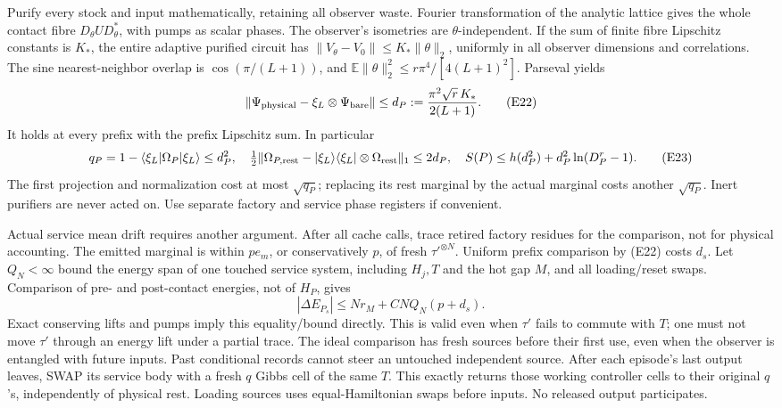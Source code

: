 \documentclass[11pt]{article}
\theoremstyle{definition}
\theoremstyle{remark}
\begin{document}
Purify every stock and input mathematically, retaining all observer
waste. Fourier transformation of the analytic lattice gives the
whole contact fibre \(D_\theta U D_\theta^*\), with pumps as scalar
phases. The observer's isometries are \(\theta\)-independent.
If the sum of finite fibre Lipschitz constants is \(K_*\), the entire
adaptive purified circuit has
\(\|V_\theta-V_0\|\le K_*\|\theta\|_2\), uniformly in all observer
dimensions and correlations. The sine nearest-neighbor overlap is
\(\cos(\pi/(L+1))\), and
\(\mathbb E\|\theta\|_2^2\le r\pi^4/[4(L+1)^2]\).
Parseval yields
\[
 \|\Psi_{\rm physical}-\xi_L\otimes\Psi_{\rm bare}\|
 \le d_P:=\frac{\pi^2\sqrt r\,K_*}{2(L+1)}.           \tag{E22}
\]
It holds at every prefix with the prefix Lipschitz sum.
In particular
\[
 q_P=1-\langle\xi_L|\Omega_P|\xi_L\rangle\le d_P^2,\quad
 \tfrac12\|\Omega_{P,\rm rest}-|\xi_L\rangle\langle\xi_L|
                          \otimes\Omega_{\rm rest}\|_1\le2d_P,
 \quad S(P)\le h(d_P^2)+d_P^2\ln(D_P^r-1).           \tag{E23}
\]
The first projection and normalization cost at most \(\sqrt{q_P}\);
replacing its rest marginal by the actual marginal costs another
\(\sqrt{q_P}\). Inert purifiers are never acted on.
Use separate factory and service phase registers if convenient.

Actual service mean drift requires another argument.
After all cache calls, trace retired factory residues for the
comparison, not for physical accounting. The emitted marginal is
within \(pe_m\), or conservatively \(p\), of fresh \(\tau'^{\otimes N}\).
Uniform prefix comparison by (E22) costs \(d_s\).
Let \(Q_N<\infty\) bound the energy span of one touched service system,
including \(H_j,T\) and the hot gap \(M\), and all loading/reset swaps.
Comparison of pre- and post-contact energies, not of \(H_P\), gives
\[
 |\Delta E_{P_s}|\le N r_M+C NQ_N(p+d_s).             \tag{E24}
\]
Exact conserving lifts and pumps imply this equality/bound directly.
This is valid even when \(\tau'\) fails to commute with \(T\);
one must not move \(\tau'\) through an energy lift under a partial trace.
The ideal comparison has fresh sources before their first use, even
when the observer is entangled with future inputs. Past conditional
records cannot steer an untouched independent source.
After each episode's last output leaves, SWAP its service body with
a fresh \(q\) Gibbs cell of the same \(T\). This exactly returns those
working controller cells to their original \(q\)'s, independently
of physical rest. Loading sources uses equal-Hamiltonian swaps before inputs.
No released output participates.
\end{document}
